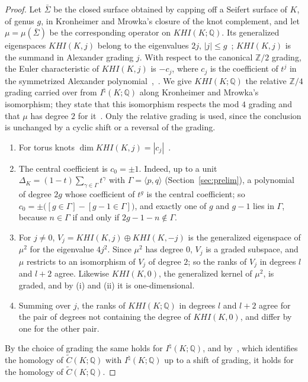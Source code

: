 \documentclass[11pt,reqno]{amsart}
\theoremstyle{plain}
\theoremstyle{definition}
\newcommand{\Z}{\mathbb{Z}}
\newcommand{\Q}{\mathbb{Q}}
\newcommand{\Inat}{I^{\natural}}
\newcommand{\tC}{\widetilde C}
\begin{document}
\begin{proof}
Let $\bar\Sigma$ be the closed surface obtained by capping off a Seifert surface of $K$, of genus $g$, in
Kronheimer and Mrowka's closure of the knot complement, and let $\mu=\mu(\bar\Sigma)$ be the corresponding
operator on $KHI(K;\Q)$. Its generalized eigenspaces $KHI(K,j)$ belong to the eigenvalues $2j$,
$|j|\le g$~\cite[Def.~2.5]{KMAlex}; $KHI(K,j)$ is the summand in Alexander grading $j$. With respect to
the canonical $\Z/2$ grading, the Euler characteristic of $KHI(K,j)$ is $-c_j$, where $c_j$ is the
coefficient of $t^j$ in the symmetrized Alexander polynomial~\cite[Thm.~1.1]{KMAlex},~\cite{Lim}. We give
$KHI(K;\Q)$ the relative $\Z/4$ grading carried over from $\Inat(K;\Q)$ along Kronheimer and Mrowka's
isomorphism; they state that this isomorphism respects the mod $4$ grading and that $\mu$ has degree $2$
for it~\cite[\S11]{KMfilt}. Only the relative grading is used, since the conclusion is unchanged by a
cyclic shift or a reversal of the grading.
\begin{enumerate}
\item[(i)] For torus knots $\dim KHI(K,j)=|c_j|$~\cite[Cor.~1.8]{LiYe}.
\item[(ii)] The central coefficient is $c_0=\pm1$. Indeed, up to a unit $\Delta_K=(1-t)\sum_{\gamma\in\Gamma}t^\gamma$
with $\Gamma=\langle p,q\rangle$ (Section~\ref{sec:prelim}), a polynomial of degree $2g$ whose coefficient of
$t^g$ is the central coefficient; so $c_0=\pm\bigl([g\in\Gamma]-[g-1\in\Gamma]\bigr)$, and exactly one of $g$
and $g-1$ lies in $\Gamma$, because $n\in\Gamma$ if and only if $2g-1-n\notin\Gamma$.
\item[(iii)] For $j\neq0$, $V_j=KHI(K,j)\oplus KHI(K,-j)$ is the generalized eigenspace of $\mu^2$ for the
eigenvalue $4j^2$. Since $\mu^2$ has degree $0$, $V_j$ is a graded subspace, and $\mu$ restricts to an
isomorphism of $V_j$ of degree $2$; so the ranks of $V_j$ in degrees $l$ and $l+2$ agree. Likewise
$KHI(K,0)$, the generalized kernel of $\mu^2$, is graded, and by (i) and (ii) it is one-dimensional.
\item[(iv)] Summing over $j$, the ranks of $KHI(K;\Q)$ in degrees $l$ and $l+2$ agree for the pair of
degrees not containing the degree of $KHI(K,0)$, and differ by one for the other pair.
\end{enumerate}
By the choice of grading the same holds for $\Inat(K;\Q)$, and by~\cite[Thm.~8.9]{DSEquiv}, which identifies
the homology of $\tC(K;\Q)$ with $\Inat(K;\Q)$ up to a shift of grading, it holds for the homology of
$\tC(K;\Q)$.
\end{proof}
\end{document}
